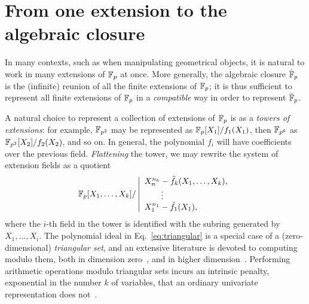 \documentclass{report}
\theoremstyle{plain}
\theoremstyle{definition}
\begin{document}

\section{From one extension to the algebraic closure}

In many contexts, such as when manipulating geometrical objects, it is
natural to work in many extensions of $\mathbb{F}_p$ at once. %
More generally, the algebraic closure $\bar{\mathbb{F}}_p$ is the (infinite)
reunion of all the finite extensions of $\mathbb{F}_p$; it is thus sufficient
to represent all finite extensions of $\mathbb{F}_p$ in a \emph{compatible}
way in order to represent $\bar{\mathbb{F}}_p$.

A natural choice to represent a collection of extensions of $\mathbb{F}_p$ is
as a \emph{towers of extensions}: for example, $\mathbb{F}_{p^2}$ may be
represented as $\mathbb{F}_{p}[X_1]/f_1(X_1)$, then $\mathbb{F}_{p^6}$ as
$\mathbb{F}_{p^2}[X_2]/f_2(X_2)$, and so on. %
In general, the polynomial $f_i$ will have coefficients over the
previous field. %
\emph{Flattening} the tower, we may rewrite the system of extension
fields as a quotient
\begin{equation}
  \label{eq:triangular}
  \mathbb{F}_p[X_1,\dots,X_k] /
  \left|\begin{array}{l}
          X_n^{n_k} - \tilde{f}_k(X_1,\dots,X_k),\\
          \qquad\vdots\\
          X_1^{n_1} - \tilde{f}_1(X_1),
        \end{array}\right.
\end{equation}
where the $i$-th field in the tower is identified with the subring
generated by $X_1,\dots,X_i$. %
The polynomial ideal in Eq.~\eqref{eq:triangular} is a special case of
a (zero-dimensional) \emph{triangular set}, and an extensive
literature is devoted to computing modulo them, both in dimension
zero~\cite{LEBRETON2015230,PoSc13b}, and in higher
dimension~\cite{Aubry:1999:TTS:2947511.2947551}. %
Performing arithmetic operations modulo triangular sets incurs an
intrinsic penalty, exponential in the number $k$ of variables, that an
ordinary univariate representation does
not~\cite{canny+kaltofen+yagati89,li+moreno+schost07,vanderHoeven:2004:TFT:1005285.1005327}. %
\end{document}

